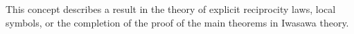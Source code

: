 This concept describes a result in the theory of explicit reciprocity laws, local symbols, or the completion of the proof of the main theorems in Iwasawa theory.
